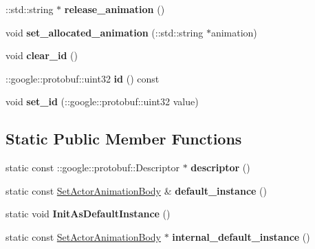 \begin{DoxyCompactItemize}
\+::std\+::string $\ast$ {\bfseries release\+\_\+animation} ()
\item 
\mbox{\label{classtbBasics_1_1SetActorAnimationBody_aeb2acb3778568ba4e92ffe209e681084}} 
void {\bfseries set\+\_\+allocated\+\_\+animation} (\+::std\+::string $\ast$animation)
\item 
\mbox{\label{classtbBasics_1_1SetActorAnimationBody_a02531d974e68110be4579f6301469f29}} 
void {\bfseries clear\+\_\+id} ()
\item 
\mbox{\label{classtbBasics_1_1SetActorAnimationBody_afa37db184aef7428873d4480dfcbfe89}} 
\+::google\+::protobuf\+::uint32 {\bfseries id} () const
\item 
\mbox{\label{classtbBasics_1_1SetActorAnimationBody_a3543768b56bcae9a3bc46a97f8525a2b}} 
void {\bfseries set\+\_\+id} (\+::google\+::protobuf\+::uint32 value)
\end{DoxyCompactItemize}
\subsection*{Static Public Member Functions}
\begin{DoxyCompactItemize}
\item 
\mbox{\label{classtbBasics_1_1SetActorAnimationBody_a17b616708245740f1864599c4afe8276}} 
static const \+::google\+::protobuf\+::\+Descriptor $\ast$ {\bfseries descriptor} ()
\item 
\mbox{\label{classtbBasics_1_1SetActorAnimationBody_aaffdce9ffe901335f9c00e605d1f5fca}} 
static const \hyperlink{classtbBasics_1_1SetActorAnimationBody}{Set\+Actor\+Animation\+Body} \& {\bfseries default\+\_\+instance} ()
\item 
\mbox{\label{classtbBasics_1_1SetActorAnimationBody_a2c6559860adf92302d31936c252866d4}} 
static void {\bfseries Init\+As\+Default\+Instance} ()
\item 
\mbox{\label{classtbBasics_1_1SetActorAnimationBody_aecc5077f8db68123f10f41bb34d285ae}} 
static const \hyperlink{classtbBasics_1_1SetActorAnimationBody}{Set\+Actor\+Animation\+Body} $\ast$ {\bfseries internal\+\_\+default\+\_\+instance} ()
\end{DoxyCompactItemize}
